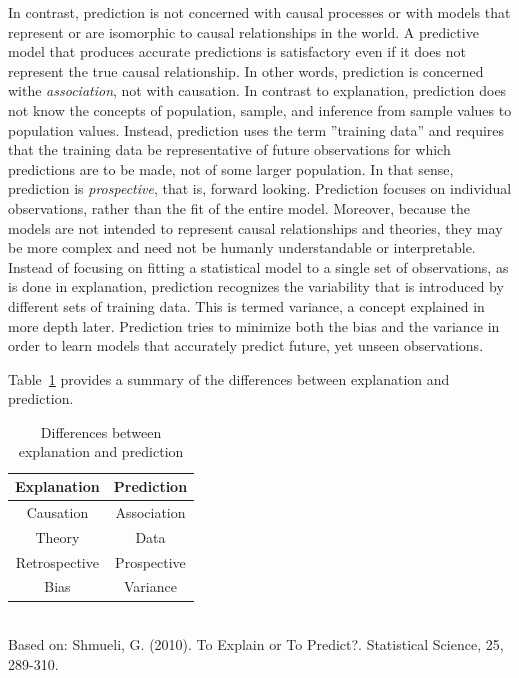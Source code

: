 In contrast, prediction is not concerned with causal processes or with models that represent or are isomorphic to causal relationships in the world. A predictive model that produces accurate predictions is satisfactory even if it does not represent the true causal relationship. In other words, prediction is concerned withe \emph{association}, not with causation. In contrast to explanation, prediction does not know the concepts of population, sample, and inference from sample values to population values. Instead, prediction uses the term ''training data'' and requires that the training data be representative of future observations for which predictions are to be made, not of some larger population. In that sense, prediction is \emph{prospective}, that is, forward looking. Prediction focuses on individual observations, rather than the fit of the entire model. Moreover, because the models are not intended to represent causal relationships and theories, they may be more complex and need not be humanly understandable or interpretable. Instead of focusing on fitting a statistical model to a single set of observations, as is done in explanation, prediction recognizes the variability that is introduced by different sets of training data. This is termed variance, a concept explained in more depth later. Prediction tries to minimize both the bias and the variance in order to learn models that accurately predict future, yet unseen observations.

Table~\ref{tab:predictexplain} provides a summary of the differences between explanation and prediction. 

\begin{table}
\centering
\renewcommand{\arraystretch}{1.25}

\begin{tabular}{c|c} \hline
\textbf{Explanation} & \textbf{Prediction} \\ \hline
Causation & Association \\
Theory & Data \\
Retrospective & Prospective \\
Bias & Variance \\ \hline
\end{tabular} \\
\vspace{5mm}
\small{Based on: Shmueli, G. (2010). To Explain or To Predict?. Statistical Science, 25, 289-310.}
\caption{Differences between explanation and prediction}
\label{tab:predictexplain}
\end{table}

